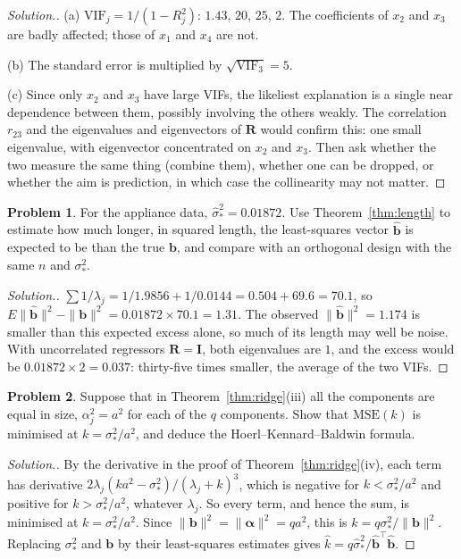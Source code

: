 \documentclass[11pt,a4paper]{article}
\numberwithin{equation}{section}
\theoremstyle{definition}
\newtheorem{problemx}{Problem}[subsection]
\newenvironment{problem}{\begin{problemx}}{\end{problemx}}
\newenvironment{solution}
  {\renewcommand{\qedsymbol}{}\begin{proof}[\textit{Solution}.]}
  {\end{proof}}
\begin{document}
\begin{solution}
(a) $\mathrm{VIF}_j = 1/(1 - R_j^2)$: $1.43$, $20$, $25$, $2$. The coefficients of $x_2$ and $x_3$ are badly
affected; those of $x_1$ and $x_4$ are not.

(b) The standard error is multiplied by $\sqrt{\mathrm{VIF}_3} = 5$.

(c) Since only $x_2$ and $x_3$ have large VIFs, the likeliest explanation is a single near dependence
between them, possibly involving the others weakly. The correlation $r_{23}$ and the eigenvalues and
eigenvectors of $\mathbf{R}$ would confirm this: one small eigenvalue, with eigenvector concentrated on $x_2$ and
$x_3$. Then ask whether the two measure the same thing (combine them), whether one can be dropped, or whether
the aim is prediction, in which case the collinearity may not matter.
\end{solution}

\begin{problem}\label{prob:length}
For the appliance data, $\hat\sigma_*^2 = 0.01872$. Use Theorem~\ref{thm:length} to estimate how much longer, in
squared length, the least-squares vector $\hat{\mathbf{b}}$ is expected to be than the true $\mathbf{b}$, and compare
with an orthogonal design with the same $n$ and $\sigma_*^2$.
\end{problem}

\begin{solution}
$\sum 1/\lambda_j = 1/1.9856 + 1/0.0144 = 0.504 + 69.6 = 70.1$, so
$E\|\hat{\mathbf{b}}\|^2 - \|\mathbf{b}\|^2 = 0.01872 \times 70.1 = 1.31$. The observed $\|\hat{\mathbf{b}}\|^2 = 1.174$ is smaller than
this expected excess alone, so much of its length may well be noise. With uncorrelated regressors $\mathbf{R} = \mathbf{I}$, both
eigenvalues are $1$, and the excess would be $0.01872 \times 2 = 0.037$: thirty-five times smaller, the
average of the two VIFs.
\end{solution}

\begin{problem}\label{prob:hkb}
Suppose that in Theorem~\ref{thm:ridge}(iii) all the components are equal in size,
$\alpha_j^2 = a^2$ for each of the $q$ components. Show that $\mathrm{MSE}(k)$ is minimised at $k = \sigma_*^2/a^2$, and deduce the
Hoerl--Kennard--Baldwin formula.
\end{problem}

\begin{solution}
By the derivative in the proof of Theorem~\ref{thm:ridge}(iv), each term has derivative
$2\lambda_j(ka^2 - \sigma_*^2)/(\lambda_j + k)^3$, which is negative for $k < \sigma_*^2/a^2$ and positive for
$k > \sigma_*^2/a^2$, whatever $\lambda_j$. So every term, and hence the sum, is minimised at
$k = \sigma_*^2/a^2$. Since $\|\mathbf{b}\|^2 = \|\boldsymbol\alpha\|^2 = qa^2$, this is
$k = q\sigma_*^2/\|\mathbf{b}\|^2$. Replacing $\sigma_*^2$ and $\mathbf{b}$ by their least-squares estimates gives
$\hat k = q\hat\sigma_*^2/\hat{\mathbf{b}}^\top\hat{\mathbf{b}}$.
\end{solution}
\end{document}
